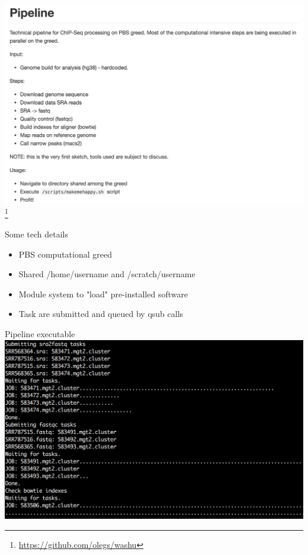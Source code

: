 \documentclass{beamer}
\begin{document}
\begin{frame}
\includegraphics[width=\linewidth]{pipelinerepo.png}\footnote{\url{https://github.com/olegs/washu}}
\end{frame}

\begin{frame}{Some tech details}
\begin{itemize}
\item PBS computational greed
\item Shared /home/username and /scratch/username
\item Module system to "load" pre-installed software
\item Task are submitted and queued by qsub calls
\end{itemize}
\end{frame}

\begin{frame}{Pipeline executable}
\includegraphics[width=\linewidth]{pipeline.png}\\
\end{frame}
\end{document}
